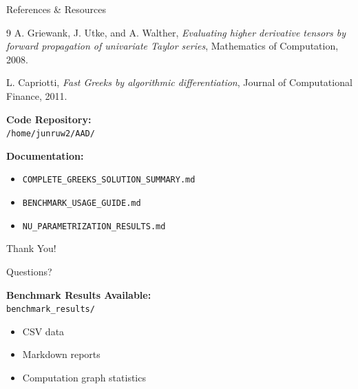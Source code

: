 \documentclass[aspectratio=169]{beamer}
\begin{document}
\begin{frame}{References \& Resources}
\begin{thebibliography}{9}
A. Griewank, J. Utke, and A. Walther,
\textit{Evaluating higher derivative tensors by forward propagation of univariate Taylor series},
Mathematics of Computation, 2008.

L. Capriotti,
\textit{Fast Greeks by algorithmic differentiation},
Journal of Computational Finance, 2011.

\textbf{Code Repository:} \\
\texttt{/home/junruw2/AAD/}

\textbf{Documentation:}
\begin{itemize}
    \item \texttt{COMPLETE\_GREEKS\_SOLUTION\_SUMMARY.md}
    \item \texttt{BENCHMARK\_USAGE\_GUIDE.md}
    \item \texttt{NU\_PARAMETRIZATION\_RESULTS.md}
\end{itemize}
\end{thebibliography}
\end{frame}

\begin{frame}[standout]
\Huge Thank You!

\vspace{2em}
\Large Questions?

\vspace{2em}
\normalsize
\textbf{Benchmark Results Available:}\\
\texttt{benchmark\_results/}
\begin{itemize}
    \item CSV data
    \item Markdown reports
    \item Computation graph statistics
\end{itemize}
\end{frame}
\end{document}
